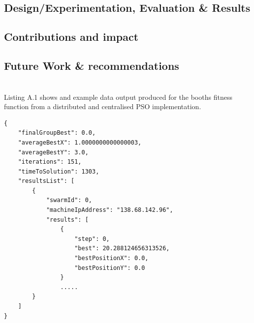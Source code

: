 \documentclass[oneside,12pt]{book}
\begin{document}
\section{Design/Experimentation, Evaluation \& Results}
\section{Contributions and impact}
\section{Future Work \& recommendations}





\appendix
\chapter{}
Listing A.1 shows and example data output produced for the booths fitness function from a distributed and centralised PSO implementation. 
\begin{lstlisting}
{
	"finalGroupBest": 0.0,
	"averageBestX": 1.0000000000000003,
	"averageBestY": 3.0,
	"iterations": 151,
	"timeToSolution": 1303,
	"resultsList": [
		{
			"swarmId": 0,
			"machineIpAddress": "138.68.142.96",
			"results": [
				{
					"step": 0,
					"best": 20.288124656313526,
					"bestPositionX": 0.0,
					"bestPositionY": 0.0
				}
				.....
		}
	]
}
\end{lstlisting}
\end{document}
